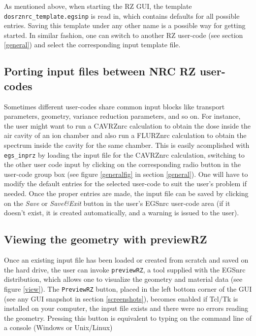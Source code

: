 \documentclass[12pt,twoside]{article}   %
\begin{document}
As mentioned above, when starting the RZ GUI, the template {\tt dosrznrc\_template.egsinp} is 
read in, which contains defaults for all possible entries. Saving this template under any other 
name is a possible way for getting started. In similar fashion, one can switch to another RZ 
user-code (see section \ref{general}) and select the corresponding input template file.

\subsection{Porting input files between NRC RZ user-codes}
\label{modifying}

 Sometimes different user-codes share common input blocks like transport parameters,
 geometry, variance reduction parameters, and so on. For instance,
 the user might want to run a CAVRZnrc calculation to obtain the dose inside the air
 cavity of an ion chamber and also run a FLURZnrc calculation to obtain the spectrum
 inside the cavity for the same chamber. This is easily acomplished with {\tt egs\_inprz}
 by loading the input file for the CAVRZnrc calculation, switching to the other user 
 code input by  clicking on the corresponding radio button in 
 the user-code group box (see figure \ref{generalfig} in section \ref{general}). 
One will have to modify the default entries for the selected user-code to suit the user's
problem if needed. Once the proper entries are made, the input file can be saved by 
clicking on the {\em Save} or {\em Save\&Exit} button  
in the user's EGSnrc user-code area (if it doesn't exist, it is created automatically, 
 and a warning is issued to the user).\\

\subsection{Viewing the geometry with previewRZ}

Once an existing input file has been loaded or created from scratch and saved on 
the hard drive,
the user can invoke 
{\tt previewRZ}, a tool supplied with the EGSnrc distribution, which allows one 
to visualize the geometry and material data (see figure \ref{view}). 
The {\tt PreviewRZ} button, placed in the left bottom corner of the GUI
(see any GUI snapshot in section \ref{screenshots}), 
becomes enabled if Tcl/Tk is installed on your computer, the input file exists 
and there were no errors reading the geometry. Pressing this button is equivalent 
to typing on the command line of a console (Windows or Unix/Linux)
\end{document}
